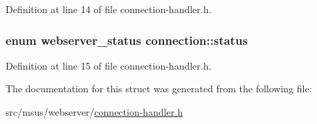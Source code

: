 Definition at line 14 of file connection-\/handler.\-h.

\hypertarget{structconnection_a70afd7d3c892d86014a13a5af6ce65e1}{
\subsubsection[{status}]{\setlength{\rightskip}{0pt plus 5cm}enum {\bf webserver\-\_\-status} connection\-::status}}\label{structconnection_a70afd7d3c892d86014a13a5af6ce65e1}


Definition at line 15 of file connection-\/handler.\-h.



The documentation for this struct was generated from the following file\-:\begin{DoxyCompactItemize}
\item 
src/msus/webserver/\hyperlink{connection-handler_8h}{connection-\/handler.\-h}\end{DoxyCompactItemize}
